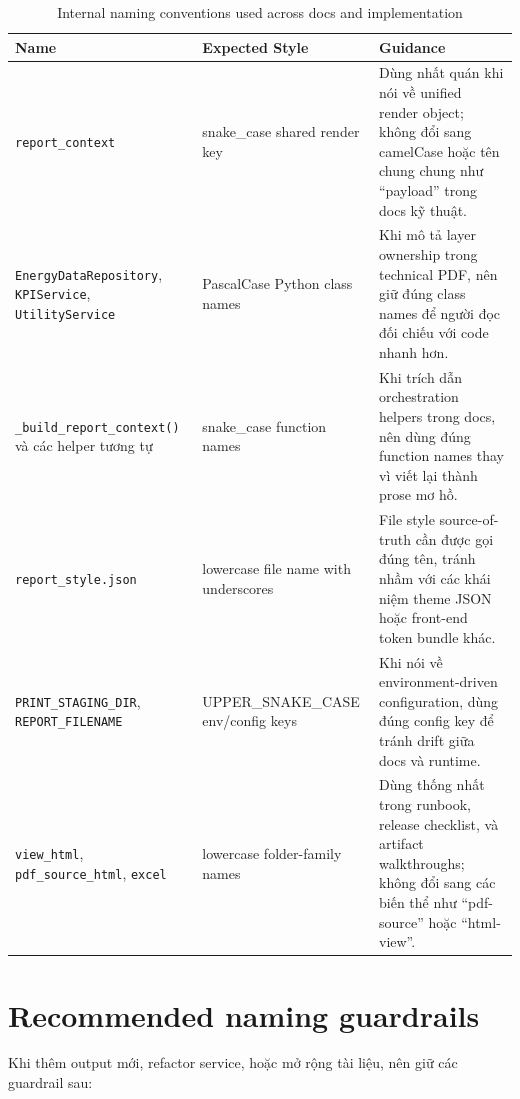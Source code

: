 \begin{table}[htbp]
	\centering
	\renewcommand{\arraystretch}{1.3}
	\caption{Internal naming conventions used across docs and implementation}
	\label{tab:internal_naming_conventions}
	\begin{tabularx}{\linewidth}{|>{\RaggedRight\arraybackslash}p{3.2cm}|>{\RaggedRight\arraybackslash}p{3.1cm}|>{\RaggedRight\arraybackslash}X|}
		\hline
		\textbf{Name} & \textbf{Expected Style} & \textbf{Guidance} \\ \hline
		\texttt{report\_context} & snake\_case shared render key & Dùng nhất quán khi nói về unified render object; không đổi sang camelCase hoặc tên chung chung như ``payload'' trong docs kỹ thuật. \\ \hline
		\texttt{EnergyDataRepository}, \texttt{KPIService}, \texttt{UtilityService} & PascalCase Python class names & Khi mô tả layer ownership trong technical PDF, nên giữ đúng class names để người đọc đối chiếu với code nhanh hơn. \\ \hline
		\texttt{\_build\_report\_context()} và các helper tương tự & snake\_case function names & Khi trích dẫn orchestration helpers trong docs, nên dùng đúng function names thay vì viết lại thành prose mơ hồ. \\ \hline
		\texttt{report\_style.json} & lowercase file name with underscores & File style source-of-truth cần được gọi đúng tên, tránh nhầm với các khái niệm theme JSON hoặc front-end token bundle khác. \\ \hline
		\texttt{PRINT\_STAGING\_DIR}, \texttt{REPORT\_FILENAME} & UPPER\_SNAKE\_CASE env/config keys & Khi nói về environment-driven configuration, dùng đúng config key để tránh drift giữa docs và runtime. \\ \hline
		\texttt{view\_html}, \texttt{pdf\_source\_html}, \texttt{excel} & lowercase folder-family names & Dùng thống nhất trong runbook, release checklist, và artifact walkthroughs; không đổi sang các biến thể như ``pdf-source'' hoặc ``html-view''. \\ \hline
	\end{tabularx}
\end{table}

\section{Recommended naming guardrails}

Khi thêm output mới, refactor service, hoặc mở rộng tài liệu, nên giữ các guardrail sau:

